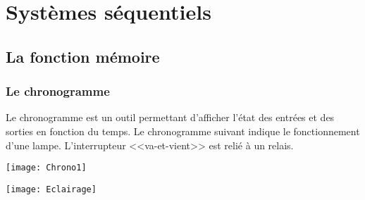 \setchapterpreamble[u]{\margintoc}

\chapter{Systèmes séquentiels}
%
%
%
%
%
%
%
%
%
%
%
%
%
%
%
%
%
%
\section{La fonction mémoire}

\subsection{Le chronogramme}
Le chronogramme est un outil permettant d'afficher l'état des entrées et des sorties en fonction du temps. Le chronogramme suivant indique le fonctionnement d'une lampe. L'interrupteur <<va-et-vient>> est relié à un relais. 

\begin{minipage}[c]{.47\linewidth}
\begin{center}
\texttt{[image: Chrono1]}
\end{center}
\end{minipage} \hfill
\begin{minipage}[c]{.47\linewidth}
\begin{center}
\texttt{[image: Eclairage]}
\end{center}
\end{minipage}

